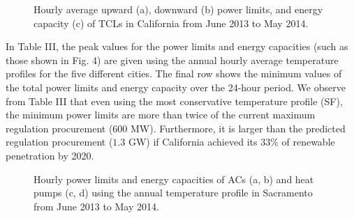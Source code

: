 \documentclass[onecolumn,journal]{IEEEtran}
\begin{document}
\begin{figure}[tb]
\centering
{}
\caption{Hourly average upward (a), downward (b) power limits, and energy capacity (c) of TCLs in California  from June 2013 to May 2014. }
\label{fig:est_capacity}
\end{figure}

In Table III, the peak values for the power limits and energy capacities (such as those shown in Fig.  4) are given using the annual hourly average temperature profiles for the five different cities. The final row shows the minimum values of the total power limits and energy capacity over the 24-hour period. We observe from Table III that even using the most conservative temperature profile (SF), the minimum power limits are more than twice of the current maximum regulation procurement ($600$ MW). Furthermore, it is larger than the  predicted regulation procurement ($1.3$ GW) if California achieved its $33\%$ of renewable penetration by 2020. 

\begin{figure}[tb]
\centering
{}
\caption{Hourly power limits and energy capacities of ACs (a, b) and heat pumps (c, d) using the annual temperature profile in Sacramento from June 2013 to May 2014. }\label{fig:yearly_capacity_SA}
\end{figure}
\end{document}
